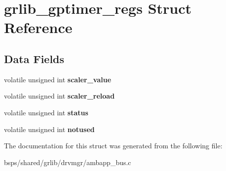\hypertarget{structgrlib__gptimer__regs}{}\section{grlib\+\_\+gptimer\+\_\+regs Struct Reference}
\label{structgrlib__gptimer__regs}
\subsection*{Data Fields}
\begin{DoxyCompactItemize}
\item 
\mbox{\label{structgrlib__gptimer__regs_a24c883552ffb406777dd1e6d183923ef}} 
volatile unsigned int {\bfseries scaler\+\_\+value}
\item 
\mbox{\label{structgrlib__gptimer__regs_aeaa3377d1f70f41e1034a146d0c8674d}} 
volatile unsigned int {\bfseries scaler\+\_\+reload}
\item 
\mbox{\label{structgrlib__gptimer__regs_a3bdc155d9ec884315b6e40de94ffe1ae}} 
volatile unsigned int {\bfseries status}
\item 
\mbox{\label{structgrlib__gptimer__regs_a1680faf66ccd60f8adc8c779cf9a4743}} 
volatile unsigned int {\bfseries notused}
\end{DoxyCompactItemize}


The documentation for this struct was generated from the following file\+:\begin{DoxyCompactItemize}
\item 
bsps/shared/grlib/drvmgr/ambapp\+\_\+bus.\+c\end{DoxyCompactItemize}
